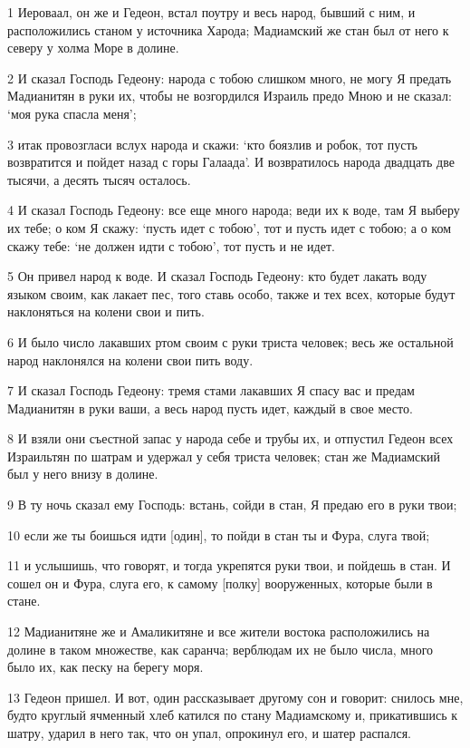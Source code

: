 \par 1 Иероваал, он же и Гедеон, встал поутру и весь народ, бывший с ним, и расположились станом у источника Харода; Мадиамский же стан был от него к северу у холма Море в долине.
\par 2 И сказал Господь Гедеону: народа с тобою слишком много, не могу Я предать Мадианитян в руки их, чтобы не возгордился Израиль предо Мною и не сказал: `моя рука спасла меня';
\par 3 итак провозгласи вслух народа и скажи: `кто боязлив и робок, тот пусть возвратится и пойдет назад с горы Галаада'. И возвратилось народа двадцать две тысячи, а десять тысяч осталось.
\par 4 И сказал Господь Гедеону: все еще много народа; веди их к воде, там Я выберу их тебе; о ком Я скажу: `пусть идет с тобою', тот и пусть идет с тобою; а о ком скажу тебе: `не должен идти с тобою', тот пусть и не идет.
\par 5 Он привел народ к воде. И сказал Господь Гедеону: кто будет лакать воду языком своим, как лакает пес, того ставь особо, также и тех всех, которые будут наклоняться на колени свои и пить.
\par 6 И было число лакавших ртом своим с руки триста человек; весь же остальной народ наклонялся на колени свои пить воду.
\par 7 И сказал Господь Гедеону: тремя стами лакавших Я спасу вас и предам Мадианитян в руки ваши, а весь народ пусть идет, каждый в свое место.
\par 8 И взяли они съестной запас у народа себе и трубы их, и отпустил Гедеон всех Израильтян по шатрам и удержал у себя триста человек; стан же Мадиамский был у него внизу в долине.
\par 9 В ту ночь сказал ему Господь: встань, сойди в стан, Я предаю его в руки твои;
\par 10 если же ты боишься идти [один], то пойди в стан ты и Фура, слуга твой;
\par 11 и услышишь, что говорят, и тогда укрепятся руки твои, и пойдешь в стан. И сошел он и Фура, слуга его, к самому [полку] вооруженных, которые были в стане.
\par 12 Мадианитяне же и Амаликитяне и все жители востока расположились на долине в таком множестве, как саранча; верблюдам их не было числа, много было их, как песку на берегу моря.
\par 13 Гедеон пришел. И вот, один рассказывает другому сон и говорит: снилось мне, будто круглый ячменный хлеб катился по стану Мадиамскому и, прикатившись к шатру, ударил в него так, что он упал, опрокинул его, и шатер распался.
